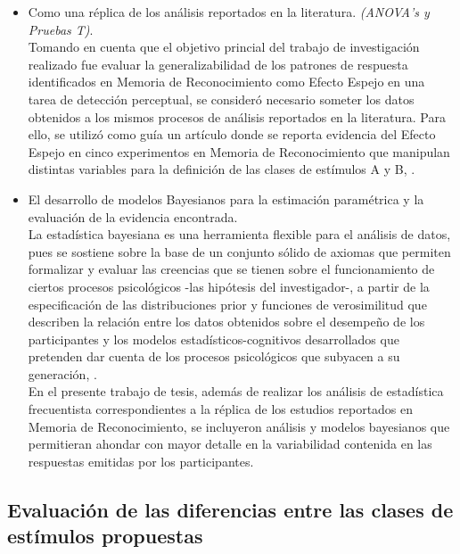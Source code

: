 \begin{itemize}
\item Como una réplica de los análisis reportados en la literatura. \textit{(ANOVA's y Pruebas T)}.\\

Tomando en cuenta que el objetivo princial del trabajo de investigación realizado fue evaluar la generalizabilidad de los patrones de respuesta identificados en Memoria de Reconocimiento como Efecto Espejo en una tarea de detección perceptual, se consideró necesario someter los datos obtenidos a los mismos procesos de análisis reportados en la literatura. Para ello, se utilizó como guía un artículo donde se reporta evidencia del Efecto Espejo en cinco experimentos en Memoria de Reconocimiento que manipulan distintas variables para la definición de las clases de estímulos A y B, \parencite{Glanzer1990}.\\

\item El desarrollo de modelos Bayesianos para la estimación paramétrica y la evaluación de la evidencia encontrada.\\

La estadística bayesiana es una herramienta flexible para el análisis de datos, pues se sostiene sobre la base de un conjunto sólido de axiomas que permiten formalizar y evaluar las creencias que se tienen sobre el funcionamiento de ciertos procesos psicológicos -las hipótesis del investigador-, a partir de la especificación de las distribuciones prior y funciones de verosimilitud que describen la relación entre los datos obtenidos sobre el desempeño de los participantes y los modelos estadísticos-cognitivos desarrollados que pretenden dar cuenta de los procesos psicológicos que subyacen a su generación, \parencite{Lee2011}.\\

En el presente trabajo de tesis, además de realizar los análisis de estadística frecuentista correspondientes a la réplica de los estudios reportados en Memoria de Reconocimiento, se incluyeron análisis y modelos bayesianos que permitieran ahondar con mayor detalle en la variabilidad contenida en las respuestas emitidas por los participantes.\\
\end{itemize}










\subsection{Evaluación de las diferencias entre las clases de estímulos propuestas}


